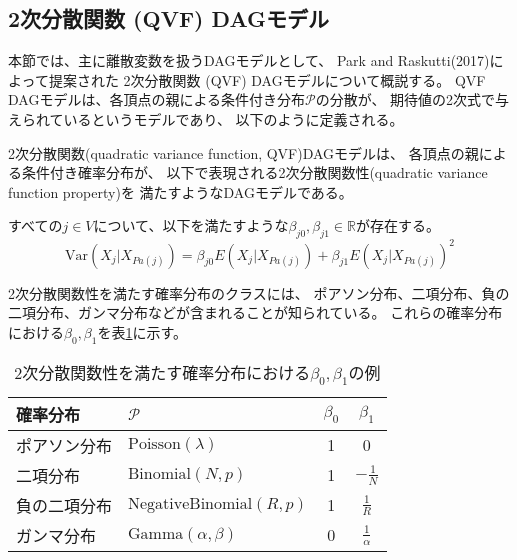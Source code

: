 
\subsection{2次分散関数 (QVF) DAGモデル}

本節では、主に離散変数を扱うDAGモデルとして、
Park and Raskutti(2017)\cite{Park2017-hw}によって提案された
2次分散関数 (QVF) DAGモデルについて概説する。
QVF DAGモデルは、各頂点の親による条件付き分布$\mathcal P$の分散が、
期待値の2次式で与えられているというモデルであり、
以下のように定義される。

\begin{df}
2次分散関数(quadratic variance function, QVF)DAGモデルは、
各頂点の親による条件付き確率分布が、
以下で表現される2次分散関数性(quadratic variance function property)を
満たすようなDAGモデルである。

すべての$j \in V$について、以下を満たすような$\beta_{j0}, \beta_{j1} \in \mathbb R$が存在する。
  \begin{equation}
      \mathrm{Var}(X_j|X_{Pa(j)}) = \beta_{j0} E(X_j | X_{Pa(j)}) + \beta_{j1} E(X_j | X_{Pa(j)})^2
      \label{QVF}
  \end{equation}
\end{df}

2次分散関数性を満たす確率分布のクラスには、
ポアソン分布、二項分布、負の二項分布、ガンマ分布などが含まれることが知られている。
これらの確率分布における$\beta_0, \beta_1$を表\ref{table:beta}に示す。

\begin{table}[ht]
  \begin{center}
    \caption{2次分散関数性を満たす確率分布における$\beta_0, \beta_1$の例}
    \begin{tabular}{llcc} \toprule
      確率分布     & $\mathcal{P}$                  & $\beta_0$ & $\beta_1$       \\ \midrule
      ポアソン分布  & $\text{Poisson}(\lambda)$      & 1         & 0               \\
      二項分布     & $\text{Binomial}(N, p)$        & 1         & $-\frac{1}{N}$   \\
      負の二項分布  & $\text{NegativeBinomial}(R,p)$ & 1         & $\frac{1}{R}$    \\
      ガンマ分布   & $\text{Gamma}(\alpha, \beta)$   & 0         & $\frac{1}{\alpha}$ \\ \bottomrule
    \end{tabular}
    \label{table:beta}
  \end{center}
\end{table}

